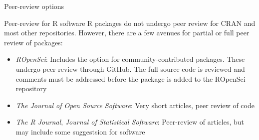 \documentclass[ignorenonframetext,]{beamer}
\begin{document}
\begin{frame}{Peer-review options}

\begin{block}{Peer-review for R software}
R packages do not undergo peer review for CRAN and most other repositories. However, there are a few avenues for partial or full peer review of packages: \begin{itemize}
  \item \textit{ROpenSci}: Includes the option for community-contributed packages. These undergo peer review through GitHub. The full source code is reviewed and comments must be addressed before the package is added to the ROpenSci repository
  \item \textit{The Journal of Open Source Software}: Very short articles, peer review of code
  \item \textit{The R Journal}, \textit{Journal of Statistical Software}: Peer-review of articles, but may include some suggestsion for software 
\end{itemize}
\end{block}

\end{frame}
\end{document}
